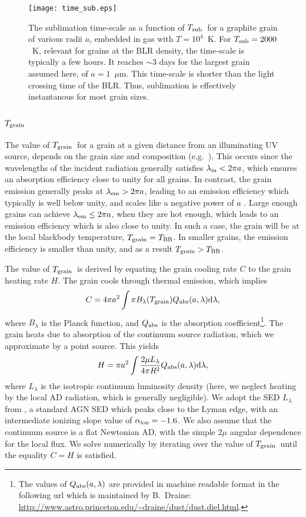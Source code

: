 \documentclass[a4paper,fleqn,usenatbib]{mnras}
\newcommand{\aion}{\mbox{$\alpha_{\rm ion}$}}
\newcommand{\dd}{\textrm{d}}
\newcommand{\mic}{\mbox{$\mu$m}}
\newcommand{\Tsub}{\mbox{$T_{\rm sub}$}}
\newcommand{\Tgr}{\mbox{$T_{\rm grain}$}}
\begin{document}
\begin{figure}
\texttt{[image: time\_sub.eps]}
\caption{The sublimation time-scale as a function of \Tsub\ for a graphite grain of various radii $a$, embedded in gas with $T=10^4$~K. For $\Tsub=2000$~K, relevant for grains at the BLR density, the time-scale is typically a few hours. It reaches $\sim 3$ days for the largest grain assumed here, of $a=1$~\mic. This time-scale is shorter than the light crossing time of the BLR. Thus, sublimation is effectively instantanous for most grain sizes.}
\label{fig:time_sub}
\end{figure}

	
\subsection{\Tgr} \label{sec:T_grain}

The value of \Tgr\ for a grain at a given distance from an illuminating UV source, depends on the grain size
and composition (e.g.\ \citealt{LaorDraine93}). This occurs since the 
wavelengths of the incident radiation generally satisfies $\lambda_{\rm in}<2\pi a$, which ensures an absorption efficiency 
close to unity for all grains. In contrast, the grain emission generally peaks at $\lambda_{\rm em}>2\pi a$, leading to an emission efficiency which typically is well below unity, and scales like a negative power of $a$ \citep{draine11}. Large enough grains can achieve 
$\lambda_{\rm em}\le 2\pi a$, when they are hot
enough, which leads to an emission efficiency which is also close to unity. In such a case, the grain will be at the local blackbody temperature, $\Tgr=T_{\rm BB}$. In smaller grains, the emission efficiency is smaller than unity, and as a result 
$\Tgr>T_{\rm BB}$.

The value of \Tgr\ is derived by equating the grain cooling rate $C$ to the grain heating rate $H$. 
The grain cools through thermal emission, which implies
\begin{equation}
C=4\pi a^2\int \pi B_{\lambda}(\Tgr)Q_{\rm abs}(a,\lambda)\dd\lambda,
\end{equation}
where $B_{\lambda}$ is the Planck function, and $Q_{\rm abs}$ is the absorption coefficient\footnote{The values of $Q_{\rm abs}(a,\lambda)$ are provided in machine readable format in the following url which is maintained by B.~Draine: \url{http://www.astro.princeton.edu/~draine/dust/dust.diel.html}.}. The grain heats due to absorption of the continuum source radiation, which we approximate by a point source. This yields
\begin{equation}
H= \pi a^2 \int \frac{2\mu L_{\lambda}}{4\pi R^2}Q_{\rm abs}(a,\lambda)\dd\lambda,
\label{eq:Heat}
\end{equation}
where $L_\lambda$ is the isotropic continuum luminosity density (here, we neglect heating by the local AD radiation, which is generally negligible). We adopt the SED $L_\lambda$ from \citet{paperII}, a standard AGN SED which peaks close to the Lyman edge, 
with an intermediate ionizing slope value of $\aion=-1.6$. We also assume that the continuum source is a flat Newtonian AD, with the simple $2\mu$ 
angular dependence for the local flux. We solve numerically by iterating over the value of \Tgr\ until the equality $C=H$ is satisfied.
\end{document}

